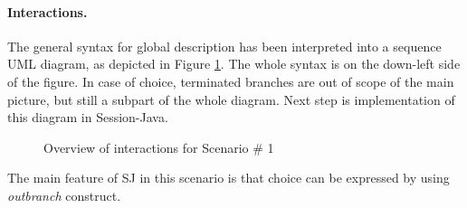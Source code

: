 \documentclass[a4paper]{easychair}
\begin{document}
\paragraph{Interactions.} The general syntax for global description has been interpreted into a sequence UML diagram, as depicted in Figure \ref{fig:interaction-overview-sc1}. The whole syntax is on the down-left side of the figure. In case of choice, terminated branches are out of scope of the main picture, but still a subpart of the whole diagram. Next step is implementation of this diagram in Session-Java.

\begin{figure}[ht]
\centering
{}
\caption{Overview of interactions for Scenario \# 1}
\label{fig:interaction-overview-sc1}
\end{figure}

The main feature of SJ in this scenario is that choice can be expressed by using \textit{outbranch} construct.
\end{document}

